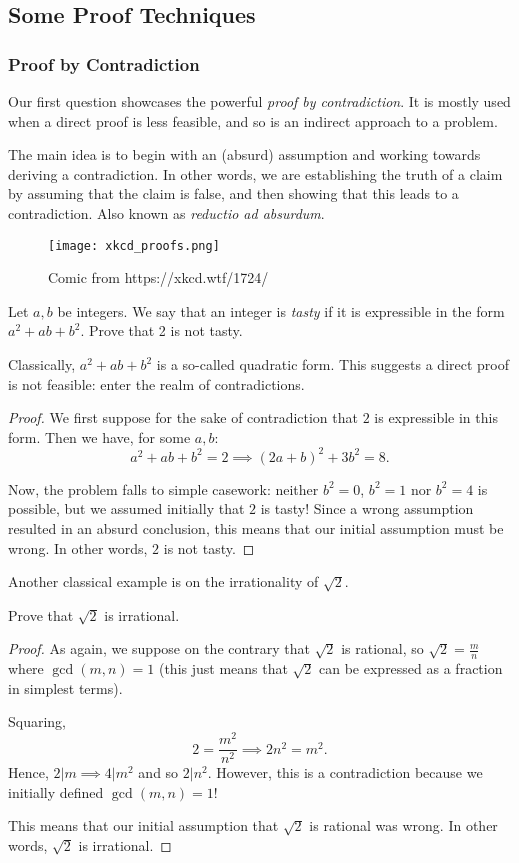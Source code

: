 \documentclass[../main.tex]{subfiles}
\begin{document}
\subsection{Some Proof Techniques}
\subsubsection{Proof by Contradiction}
Our first question showcases the powerful \textit{proof by contradiction}. It is mostly used when a direct proof is less feasible, and so is an indirect approach to a problem.

The main idea is to begin with an (absurd) assumption and working towards deriving a contradiction. In other words, we are establishing the truth of a claim by assuming that the claim is false, and then showing that this leads to a contradiction. Also known as \textit{reductio ad absurdum}.
\begin{figure}[H]
    \centering
    \texttt{[image: xkcd\_proofs.png]}
    \caption{Comic from https://xkcd.wtf/1724/}
\end{figure}

\begin{example}[Classic]
Let $a, b$ be integers. We say that an integer is \textit{tasty} if it is expressible in the form $a^2+ab+b^2$. Prove that 2 is not tasty.
\end{example}
Classically, $a^2+ab+b^2$ is a so-called quadratic form. This suggests a direct proof is not feasible: enter the realm of contradictions.

\begin{proof}
We first suppose for the sake of contradiction that $2$ is expressible in this form. Then we have, for some $a,b$: 
$$a^2+ab+b^2=2 \implies (2a+b)^2+3b^2=8.$$

Now, the problem falls to simple casework: neither $b^2=0$, $b^2=1$ nor $b^2=4$ is possible, but we assumed initially that $2$ is tasty! Since a wrong assumption resulted in an absurd conclusion, this means that our initial assumption must be wrong. In other words, $2$ is not tasty.
\end{proof}

Another classical example is on the irrationality of $\sqrt{2}$. 
\begin{example}[Classic]
    Prove that $\sqrt{2}$ is irrational.
\end{example}
\begin{proof}
As again, we suppose on the contrary that $\sqrt{2}$ is rational, so $\sqrt{2}=\frac{m}{n}$ where $\gcd(m,n)=1$ (this just means that $\sqrt{2}$ can be expressed as a fraction in simplest terms).

Squaring, $$2=\frac{m^2}{n^2} \implies 2n^2=m^2.$$ Hence, $2|m \implies 4|m^2$ and so $2|n^2$. However, this is a contradiction because we initially defined $\gcd(m,n)=1$! 

This means that our initial assumption that $\sqrt{2}$ is rational was wrong. In other words, $\sqrt{2}$ is irrational.
\end{proof}
\end{document}
